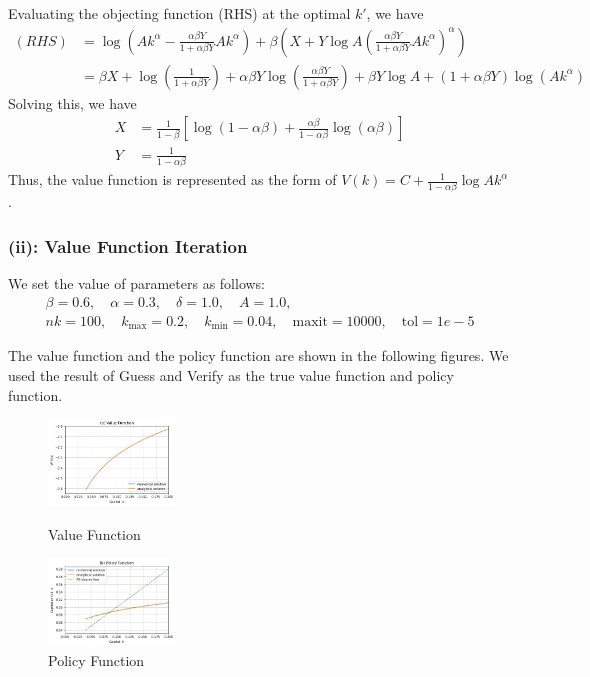\documentclass{ltjsarticle}
\begin{document}
Evaluating the objecting function (RHS) at the optimal $k'$, we have
\begin{align*}
    (RHS)
    &= \log \left( A k^\alpha - \frac{\alpha \beta Y}{1 + \alpha \beta Y} A k^\alpha \right) + \beta (X + Y \log A \left( \frac{\alpha \beta Y}{1 + \alpha \beta Y} A k^\alpha \right)^\alpha) \\
    &= \beta X + \log \left( \frac{1}{1+\alpha\beta Y}\right) + \alpha\beta Y \log \left( \frac{\alpha \beta Y}{1+\alpha \beta Y}\right) + \beta Y \log A + (1+\alpha\beta Y) \log(A k^\alpha)
\end{align*}
Solving this, we have
\begin{align*}
    X &= \frac{1}{1-\beta} \left[ \log \left( 1-\alpha\beta \right) +  \frac{\alpha \beta}{1 - \alpha \beta} \log \left( \alpha \beta \right)  \right] \\
    Y &= \frac{1}{1-\alpha\beta} 
\end{align*}
Thus, the value function is represented as the form of $V(k) = C + \frac{1}{1-\alpha\beta}\log A k^\alpha$. 

\subsubsection*{(ii): Value Function Iteration}

We set the value of parameters as follows:
\begin{gather*}
    \beta = 0.6, \quad \alpha = 0.3, \quad \delta = 1.0, \quad A = 1.0, \\ nk = 100, \quad k_{\max} = 0.2, \quad k_{\min} = 0.04, \quad \text{maxit} = 10000, \quad \text{tol} = 1e-5
\end{gather*}

The value function and the policy function are shown in the following figures. We used the result of Guess and Verify as the true value function and policy function.
\begin{figure}[htbp]
    \centering
    \begin{minipage}[b]{\textwidth}
        \centering
        \includegraphics[width=0.3\textwidth]{Q2_VF.png}
        \caption{Value Function}
        \label{fig:value_function}
    \end{minipage}
    \begin{minipage}[b]{\textwidth}
        \centering
        \includegraphics[width=0.3\textwidth]{Q2_PF.png}
        \caption{Policy Function}
        \label{fig:policy_function}
    \end{minipage}
    \label{fig:value_and_policy_functions}
\end{figure}
\end{document}

